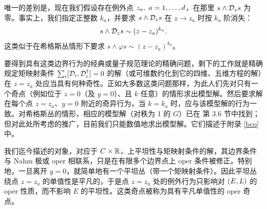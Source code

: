 唯一的差别是，现在我们假设存在例外点 $z_a,~a=1,\dots,\ss$，在那里 $s\wedge \D_z s$ 为零。事实上，我们指定正整数 $k_a $，并要求 $s\wedge \D_z s$ 在 $z\to z_a$ 时按 $k_a $ 阶消失：
\begin{equation}\label{badpoint} s\wedge \D_z s\sim (z-z_a)^{k_a}.\end{equation}
这类似于在希格斯丛情形下要求 $s\wedge\varphi s\sim (z-z_a)^{k_a}$。

要得到具有这类边界行为的经典或量子规范理论的精确问题，剩下的工作就是精确规定矩映射条件 $\sum_i[\D_i,\D_i^\dagger]=0$ 的解（或可维数约化到它的四维、五维方程的解）在 $z=z_a$ 处应当具有何种奇性。正如大多数这类问题那样，为此人们先对只有一个奇点（例如位于 $z=0$（及 $y=0$）、且 $k$ 任意）的情形求出模型解。然后要求解在每个点 $z=z_a$、$y=0$ 附近的奇异行为，当 $k=k_a$ 时，应与该模型解的行为一致。对希格斯丛的情形，相应的模型解（对秩为 1 的 $G$）已在 \cite{fiveknots} 第 3.6 节中找到；但对此处所考虑的推广，目前我们只能数值地求出模型解。它们描述于附录 \ref{bco} 中。

我们迄今描述的对象，对应于 $C\times \R_+$ 上平坦性与矩映射条件的解，其边界条件与 Nahm 极或 oper 相联系，只是在有限多个边界点上 oper 条件被修正。特别地，一旦离开 $y=0$，就简单地有一个平坦丛（带一个矩映射条件）。因此平坦丛绕点 $z=z_a$ 的单值性是平凡的，于是点 $z=z_a$ 处的例外行为只影响对 $(E,\L)$ 的 oper 性质，而不影响 $E$ 的平坦性。这类奇点被称为具有平凡单值性的 oper 奇点。
